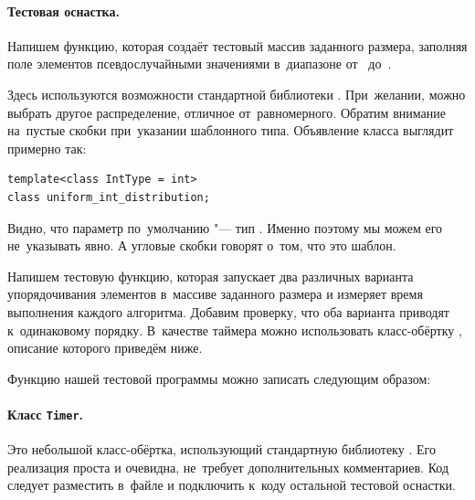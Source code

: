 


\paragraph{Тестовая оснастка.}
Напишем функцию, которая создаёт тестовый массив заданного размера, заполняя поле  элементов псевдослучайными значениями в~диапазоне от~ до~.


\noindent Здесь используются возможности стандартной библиотеки . При~желании, можно выбрать другое распределение, отличное от~равномерного. Обратим внимание на~пустые скобки при~указании шаблонного типа. Объявление класса выглядит примерно так:

\begin{verbatim}
template<class IntType = int>
class uniform_int_distribution;
\end{verbatim}

\noindent Видно, что параметр по~умолчанию "--- тип . Именно поэтому мы можем его не~указывать явно. А угловые скобки говорят о~том, что это шаблон.

Напишем тестовую функцию, которая запускает два различных варианта упорядочивания элементов в~массиве заданного размера и измеряет время выполнения каждого алгоритма. Добавим проверку, что оба варианта приводят к~одинаковому порядку. В~качестве таймера можно использовать класс-обёртку , описание которого приведём ниже.


Функцию  нашей тестовой программы можно записать следующим образом:




\paragraph{Класс \texttt{Timer}.}
Это небольшой класс-обёртка, использующий стандартную библиотеку . Его реализация проста и очевидна, не~требует дополнительных комментариев. Код следует разместить в~файле  и подключить к~коду остальной тестовой оснастки.

